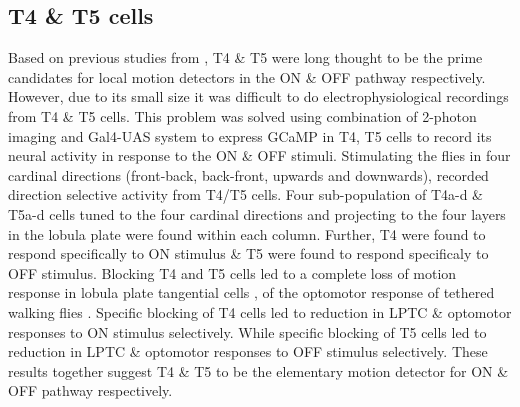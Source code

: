 \subsection{T4 \& T5 cells}
Based on previous studies from \parencite{Fischbach1989, Buchner1984}, T4 \& T5 were long thought to be the prime candidates for local motion detectors in the ON \& OFF pathway respectively. However, due to its small size it was difficult to do electrophysiological recordings from T4 \& T5 cells. This problem was solved using combination of 2-photon imaging and Gal4-UAS system to express GCaMP in T4, T5 cells to record its neural activity in response to the ON \& OFF stimuli. Stimulating the flies in four cardinal directions (front-back, back-front, upwards and downwards), \cite{Maisak2013} recorded direction selective activity from T4/T5 cells. Four sub-population of T4a-d \& T5a-d cells tuned to the four cardinal directions and projecting to the four layers in the lobula plate were found within each column. Further, T4 were found to respond specifically to ON stimulus \& T5 were found to respond specificaly to OFF stimulus. Blocking T4 and T5 cells led to a complete loss of motion response in lobula plate tangential cells \parencite{Schnell2012}, of the optomotor response of tethered walking flies \parencite{Bahl2013}. Specific blocking of T4 cells led to reduction in LPTC \& optomotor responses to ON stimulus selectively. While specific blocking of T5 cells led to reduction in LPTC \& optomotor responses to OFF stimulus selectively. These results together suggest T4 \& T5 to be the elementary motion detector for ON \& OFF pathway respectively\parencite{Maisak2013}.      

